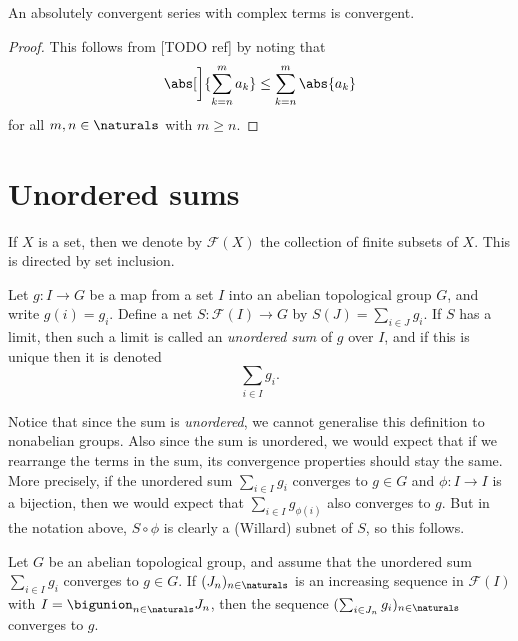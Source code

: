 \documentclass[article, a4paper, 11pt, oneside]{memoir}
\numberwithin{equation}{chapter}
\newcommand{\calF}{\mathcal{F}}
\begin{document}
\begin{corollary}
    An absolutely convergent series with complex terms is convergent.
\end{corollary}

\begin{proof}
    This follows from [TODO ref] by noting that
    \begin{equation*}
        \abs[\bigg]{ \sum_{k=n}^m a_k }
            \leq \sum_{k=n}^m \abs{a_k}
    \end{equation*}
    for all $m,n \in \naturals$ with $m \geq n$.
\end{proof}


\section{Unordered sums}

\newcommand{\finsubsets}[1]{\calF(#1)}

If $X$ is a set, then we denote by $\finsubsets{X}$ the collection of finite subsets of $X$. This is directed by set inclusion.

\begin{definition}
    Let $g \colon I \to G$ be a map from a set $I$ into an abelian topological group $G$, and write $g(i) = g_i$. Define a net $S \colon \finsubsets{I} \to G$ by $S(J) = \sum_{i \in J} g_i$. If $S$ has a limit, then such a limit is called an \emph{unordered sum} of $g$ over $I$, and if this is unique then it is denoted
    \begin{equation*}
        \sum_{i \in I} g_i.
    \end{equation*}
\end{definition}
%
Notice that since the sum is \emph{unordered}, we cannot generalise this definition to nonabelian groups. Also since the sum is unordered, we would expect that if we rearrange the terms in the sum, its convergence properties should stay the same. More precisely, if the unordered sum $\sum_{i \in I} g_i$ converges to $g \in G$ and $\phi \colon I \to I$ is a bijection, then we would expect that $\sum_{i \in I} g_{\phi(i)}$ also converges to $g$. But in the notation above, $S \circ \phi$ is clearly a (Willard) subnet of $S$, so this follows.

\begin{lemma}
    \label{lem:unordered-sum-subsequence}
    Let $G$ be an abelian topological group, and assume that the unordered sum $\sum_{i \in I} g_i$ converges to $g \in G$. If $(J_n)_{n\in\naturals}$ is an increasing sequence in $\finsubsets{I}$ with $I = \bigunion_{n\in\naturals} J_n$, then the sequence $(\sum_{i \in J_n} g_i)_{n\in\naturals}$ converges to $g$.
\end{lemma}
\end{document}

